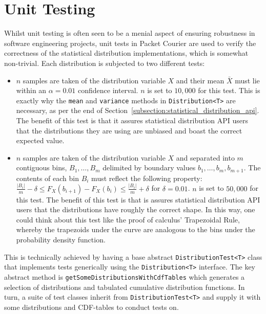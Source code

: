 \section{Unit Testing}\label{section:unit_testing}

Whilst unit testing is often seen to be a menial aspect of ensuring robustness in software engineering projects,
unit tests in Packet Courier are used to verify the correctness of the statistical distribution implementations,
which is somewhat non-trivial. Each distribution is subjected to two different tests:
\begin{itemize}
    \item $n$ samples are taken of the distribution variable $X$ and their mean $\bar{X}$ must lie within an $\alpha
    = 0.01$ confidence interval. $n$ is set to $10,000$ for this test. This is exactly why the \texttt{mean} and
    \texttt{variance} methods in \texttt{Distribution<T>} are necessary, as per the end of
    Section~\ref{subsection:statistical_distribution_api}. The benefit of this test is that it assures statistical
    distribution API users that the distributions they are using are unbiased and boast the correct expected value.
    \item $n$ samples are taken of the distribution variable $X$ and separated into $m$ contiguous bins, $B_1, \dots ,
    B_m$ delimited by boundary values $b_1, \dots , b_m, b_{m+1}$. The contents of each bin $B_i$ must reflect the
    following property: $\frac{|B_i|}{m} - \delta \leq F_X(b_{i+1}) - F_X(b_i) \leq \frac{|B_i|}{m} + \delta$ for
    $\delta = 0.01$. $n$ is set to $50,000$ for this test. The benefit of this test is that is assures statistical
    distribution API users that the distributions have roughly the correct shape. In this way, one could think about
    this test like the proof of calculus' Trapezoidal Rule\cite{trapezoidal_rule}, whereby the trapezoids under the
    curve are analogous to the bins under the probability density function.
\end{itemize}

This is technically achieved by having a base abstract \texttt{DistributionTest<T>} class that implements tests
generically using the \texttt{Distribution<T>} interface. The key abstract method is
\texttt{getSomeDistributionsWithCdfTables} which generates a selection of distributions and tabulated cumulative
distribution functions. In turn, a suite of test classes inherit from \texttt{DistributionTest<T>} and supply it with
some distributions and CDF-tables to conduct tests on.


